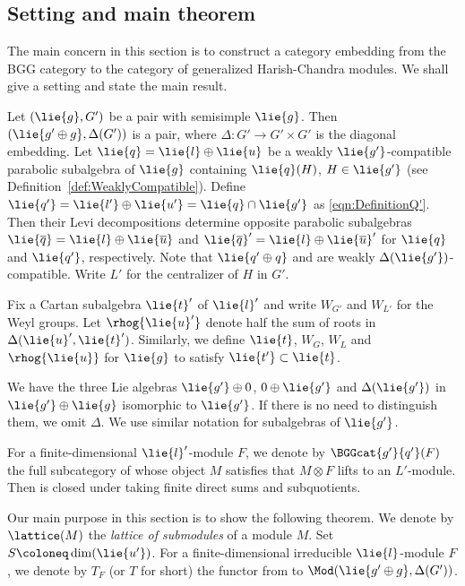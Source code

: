 \subsection{Setting and main theorem}\label{subsect:EmbeddingSetting}

The main concern in this section is to construct a category embedding
from the BGG category to the category of generalized Harish-Chandra modules.
We shall give a setting and state the main result.

Let $(\lie{g}, G')$ be a pair with semisimple $\lie{g}$.
Then $(\lie{g'\oplus g}, \Delta(G'))$ is a pair, where $\Delta\colon G'\rightarrow G'\times G'$ is the diagonal embedding.
Let $\lie{q} = \lie{l}\oplus \lie{u}$ be a weakly $\lie{g'}$-compatible parabolic subalgebra of $\lie{g}$
containing $\lie{q}(H)$, $H \in \lie{g'}$ (see Definition~\ref{def:WeaklyCompatible}).
Define $\lie{q'} = \lie{l'} \oplus \lie{u'} = \lie{q}\cap \lie{g'}$ as \eqref{eqn:DefinitionQ'}.
Then their Levi decompositions determine opposite parabolic subalgebras $\lie{\overline{q}} = \lie{l}\oplus \lie{\overline{u}}$ and $\lie{\overline{q}}' = \lie{l}\oplus \lie{\overline{u}}'$ for $\lie{q}$ and $\lie{q'}$, respectively.
Note that $\lie{q'\oplus q}$ and  are weakly $\Delta(\lie{g'})$-compatible.
Write $L'$ for the centralizer of $H$ in $G'$.

Fix a Cartan subalgebra $\lie{t}'$ of $\lie{l}'$ and write $W_{G'}$ and $W_{L'}$ for the Weyl groups.
Let $\rhog{\lie{u}'}$ denote half the sum of roots in $\Delta(\lie{u}', \lie{t}')$.
Similarly, we define $\lie{t}$, $W_{G}$, $W_{L}$ and $\rhog{\lie{u}}$ for $\lie{g}$ to satisfy $\lie{t'}\subset \lie{t}$.

We have the three Lie algebras $\lie{g'}\oplus 0$, $0\oplus \lie{g'}$ and $\Delta(\lie{g'})$ in $\lie{g'}\oplus \lie{g}$ isomorphic to $\lie{g'}$.
If there is no need to distinguish them, we omit $\Delta$.
We use similar notation for subalgebras of $\lie{g'}$.

For a finite-dimensional $\lie{l}'$-module $F$,
we denote by $\BGGcat{g'}{q'}(F)$ the full subcategory of  whose object $M$ satisfies that $M\otimes F$ lifts to an $L'$-module.
Then  is closed under taking finite direct sums and subquotients.

Our main purpose in this section is to show the following theorem.
We denote by $\lattice(M)$ the \emph{lattice of submodules} of a module $M$.
Set $S\coloneq \dim(\lie{u'})$.
For a finite-dimensional irreducible $\lie{l}$-module $F$, we denote by $T_F$ (or $T$ for short) the functor  from  to $\Mod(\lie{g'\oplus g}, \Delta(G'))$.

